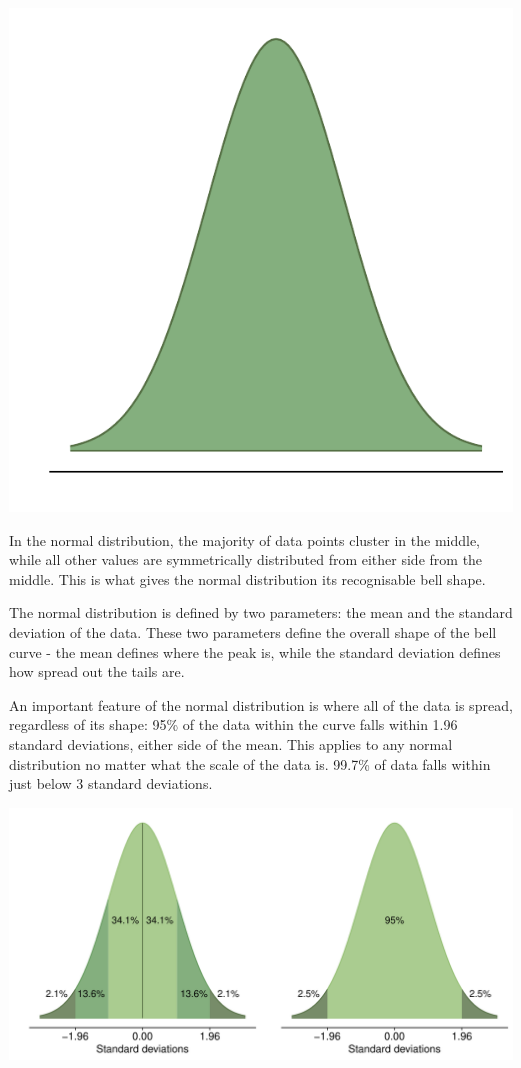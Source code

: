 \documentclass[
]{book}
\begin{document}
\begin{center}\includegraphics{_main_files/figure-latex/unnamed-chunk-68-1} \end{center}

In the normal distribution, the majority of data points cluster in the middle, while all other values are symmetrically distributed from either side from the middle. This is what gives the normal distribution its recognisable bell shape.

The normal distribution is defined by two parameters: the mean and the standard deviation of the data. These two parameters define the overall shape of the bell curve - the mean defines where the peak is, while the standard deviation defines how spread out the tails are.

An important feature of the normal distribution is where all of the data is spread, regardless of its shape: 95\% of the data within the curve falls within 1.96 standard deviations, either side of the mean. This applies to any normal distribution no matter what the scale of the data is. 99.7\% of data falls within just below 3 standard deviations.

\begin{center}\includegraphics{_main_files/figure-latex/unnamed-chunk-69-1} \end{center}
\end{document}
